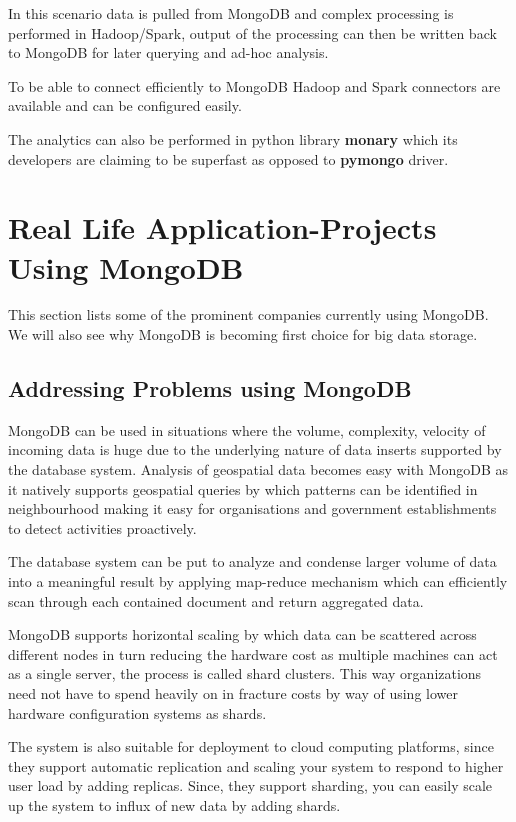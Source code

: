 \documentclass[9pt,twocolumn,twoside]{../../styles/osajnl}
\begin{document}
In this scenario data is pulled from MongoDB and complex processing is performed in Hadoop/Spark, output of the processing can then be written back to MongoDB for later querying and ad-hoc analysis.

To be able to connect efficiently to MongoDB Hadoop and Spark connectors are available and can be configured easily.

The analytics can also be performed in python library {\bfseries monary} which its developers are claiming to be superfast as opposed to {\bfseries pymongo} driver.

\section{Real Life Application-Projects Using MongoDB}

This section lists some of the prominent companies currently using MongoDB. We will also see why MongoDB is becoming first choice for big data storage. 

\subsection{Addressing Problems using MongoDB}

MongoDB can be used in situations where the volume, complexity, velocity of incoming data is huge due to the underlying nature of data inserts supported by the database system. Analysis of geospatial data becomes easy with MongoDB as it natively supports geospatial queries by which patterns can be identified in neighbourhood making it easy for organisations and government establishments to detect activities proactively.

The database system can be put to analyze and condense larger volume of data into a meaningful result by applying map-reduce mechanism which can efficiently scan through each contained document and return aggregated data. \cite{www-mongo12}

MongoDB supports horizontal scaling by which data can be scattered across different nodes in turn reducing the hardware cost as multiple machines can act as a single server, the process is called shard clusters. This way organizations need not have to spend heavily on in fracture costs by way of using lower hardware configuration systems as shards.

\cite{www-mongo2} The system is also suitable for deployment to cloud computing platforms, since they support automatic replication and scaling your system to respond to higher user load by adding replicas. Since, they support sharding, you can easily scale up the system to influx of new data by adding shards.
\end{document}
